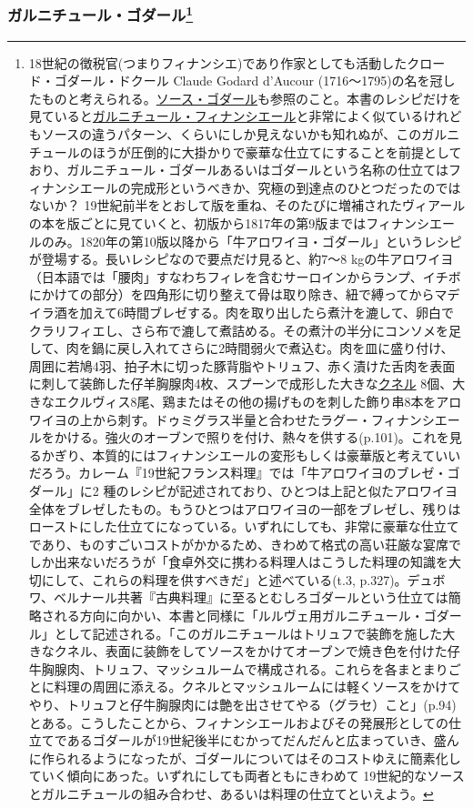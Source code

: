 \begin{recette}
{\subsubsection[ガルニチュール・ゴダール]{\texorpdfstring{ガルニチュール・ゴダール\footnote{18世紀の徴税官(つまりフィナンシエ)であり作家としても活動したクロード・ゴダール・ドクール
  Claude Godard d'Aucour
  (1716〜1795)の名を冠したものと考えられる。\protect\hyperlink{sauce-godard}{ソース・ゴダール}も参照のこと。本書のレシピだけを見ていると\protect\hyperlink{garniture-financiere}{ガルニチュール・フィナンシエール}と非常によく似ているけれどもソースの違うパターン、くらいにしか見えないかも知れぬが、このガルニチュールのほうが圧倒的に大掛かりで豪華な仕立てにすることを前提としており、ガルニチュール・ゴダールあるいはゴダールという名称の仕立てはフィナンシエールの完成形というべきか、究極の到達点のひとつだったのではないか？
  19世紀前半をとおして版を重ね、そのたびに増補されたヴィアールの本を版ごとに見ていくと、初版から1817年の第9版まではフィナンシエールのみ。1820年の第10版以降から「牛アロワイヨ・ゴダール」というレシピが登場する。長いレシピなので要点だけ見ると、約7〜8
  kgの牛アロワイヨ（日本語では「腰肉」すなわちフィレを含むサーロインからランプ、イチボにかけての部分）を四角形に切り整えて骨は取り除き、紐で縛ってからマデイラ酒を加えて6時間ブレゼする。肉を取り出したら煮汁を漉して、卵白でクラリフィエし、さら布で漉して煮詰める。その煮汁の半分にコンソメを足して、肉を鍋に戻し入れてさらに2時間弱火で煮込む。肉を皿に盛り付け、周囲に若鳩4羽、拍子木に切った豚背脂やトリュフ、赤く漬けた舌肉を表面に刺して装飾した仔羊胸腺肉4枚、スプーンで成形した大きな\protect\hyperlink{quenelles-diverses}{クネル}
  8個、大きなエクルヴィス8尾、鶏またはその他の揚げものを刺した飾り串8本をアロワイヨの上から刺す。ドゥミグラス半量と合わせたラグー・フィナンシエールをかける。強火のオーブンで照りを付け、熱々を供する(p.101)。これを見るかぎり、本質的にはフィナンシエールの変形もしくは豪華版と考えていいだろう。カレーム『19世紀フランス料理』では「牛アロワイヨのブレゼ・ゴダール」に2
  種のレシピが記述されており、ひとつは上記と似たアロワイヨ全体をブレゼしたもの。もうひとつはアロワイヨの一部をブレゼし、残りはローストにした仕立てになっている。いずれにしても、非常に豪華な仕立てであり、ものすごいコストがかかるため、きわめて格式の高い荘厳な宴席でしか出来ないだろうが「食卓外交に携わる料理人はこうした料理の知識を大切にして、これらの料理を供すべきだ」と述べている(t.3,
  p.327)。デュボワ、ベルナール共著『古典料理』に至るとむしろゴダールという仕立ては簡略される方向に向かい、本書と同様に「ルルヴェ用ガルニチュール・ゴダール」として記述される。「このガルニチュールはトリュフで装飾を施した大きなクネル、表面に装飾をしてソースをかけてオーブンで焼き色を付けた仔牛胸腺肉、トリュフ、マッシュルームで構成される。これらを各まとまりごとに料理の周囲に添える。クネルとマッシュルームには軽くソースをかけてやり、トリュフと仔牛胸腺肉には艶を出させてやる（グラセ）こと」(p.94)とある。こうしたことから、フィナンシエールおよびその発展形としての仕立てであるゴダールが19世紀後半にむかってだんだんと広まっていき、盛んに作られるようになったが、ゴダールについてはそのコストゆえに簡素化していく傾向にあった。いずれにしても両者ともにきわめて
  19世紀的なソースとガルニチュールの組み合わせ、あるいは料理の仕立てといえよう。}}{ガルニチュール・ゴダール}}\label{garniture-godard}}


\end{recette}
